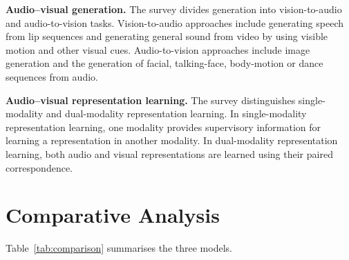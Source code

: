 \documentclass[pdflatex,sn-mathphys-num]{sn-jnl}%
\theoremstyle{thmstyleone}%
\theoremstyle{thmstyletwo}%
\theoremstyle{thmstylethree}%
\begin{document}
\textbf{Audio--visual generation.} The survey divides generation into vision-to-audio and audio-to-vision tasks. Vision-to-audio approaches include generating speech from lip sequences and generating general sound from video by using visible motion and other visual cues. Audio-to-vision approaches include image generation and the generation of facial, talking-face, body-motion or dance sequences from audio.

\textbf{Audio--visual representation learning.} The survey distinguishes single-modality and dual-modality representation learning. In single-modality representation learning, one modality provides supervisory information for learning a representation in another modality. In dual-modality representation learning, both audio and visual representations are learned using their paired correspondence.

\section{Comparative Analysis}\label{sec5}


Table~\ref{tab:comparison} summarises the three models.
\end{document}
